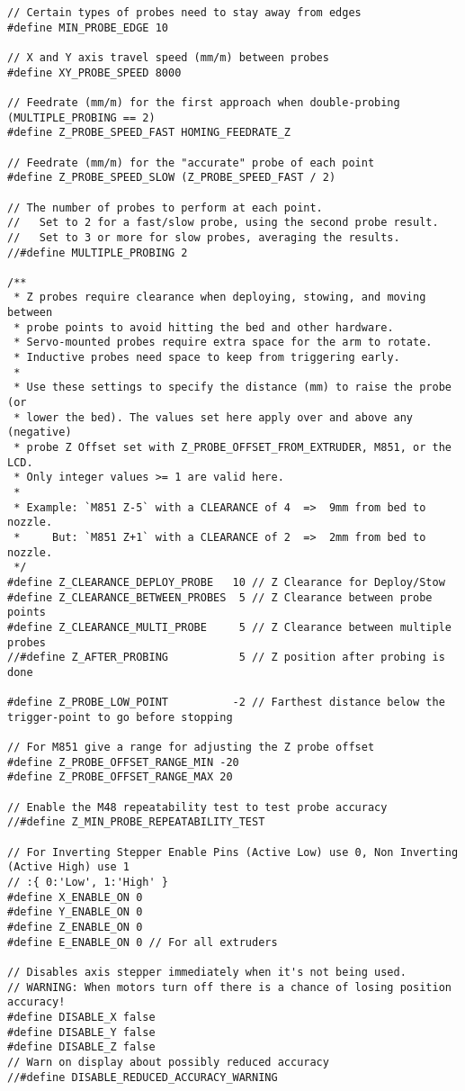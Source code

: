 \begin{lstlisting}[caption = キャプション, label = ラベル]
// Certain types of probes need to stay away from edges
#define MIN_PROBE_EDGE 10

// X and Y axis travel speed (mm/m) between probes
#define XY_PROBE_SPEED 8000

// Feedrate (mm/m) for the first approach when double-probing (MULTIPLE_PROBING == 2)
#define Z_PROBE_SPEED_FAST HOMING_FEEDRATE_Z

// Feedrate (mm/m) for the "accurate" probe of each point
#define Z_PROBE_SPEED_SLOW (Z_PROBE_SPEED_FAST / 2)

// The number of probes to perform at each point.
//   Set to 2 for a fast/slow probe, using the second probe result.
//   Set to 3 or more for slow probes, averaging the results.
//#define MULTIPLE_PROBING 2

/**
 * Z probes require clearance when deploying, stowing, and moving between
 * probe points to avoid hitting the bed and other hardware.
 * Servo-mounted probes require extra space for the arm to rotate.
 * Inductive probes need space to keep from triggering early.
 *
 * Use these settings to specify the distance (mm) to raise the probe (or
 * lower the bed). The values set here apply over and above any (negative)
 * probe Z Offset set with Z_PROBE_OFFSET_FROM_EXTRUDER, M851, or the LCD.
 * Only integer values >= 1 are valid here.
 *
 * Example: `M851 Z-5` with a CLEARANCE of 4  =>  9mm from bed to nozzle.
 *     But: `M851 Z+1` with a CLEARANCE of 2  =>  2mm from bed to nozzle.
 */
#define Z_CLEARANCE_DEPLOY_PROBE   10 // Z Clearance for Deploy/Stow
#define Z_CLEARANCE_BETWEEN_PROBES  5 // Z Clearance between probe points
#define Z_CLEARANCE_MULTI_PROBE     5 // Z Clearance between multiple probes
//#define Z_AFTER_PROBING           5 // Z position after probing is done

#define Z_PROBE_LOW_POINT          -2 // Farthest distance below the trigger-point to go before stopping

// For M851 give a range for adjusting the Z probe offset
#define Z_PROBE_OFFSET_RANGE_MIN -20
#define Z_PROBE_OFFSET_RANGE_MAX 20

// Enable the M48 repeatability test to test probe accuracy
//#define Z_MIN_PROBE_REPEATABILITY_TEST

// For Inverting Stepper Enable Pins (Active Low) use 0, Non Inverting (Active High) use 1
// :{ 0:'Low', 1:'High' }
#define X_ENABLE_ON 0
#define Y_ENABLE_ON 0
#define Z_ENABLE_ON 0
#define E_ENABLE_ON 0 // For all extruders

// Disables axis stepper immediately when it's not being used.
// WARNING: When motors turn off there is a chance of losing position accuracy!
#define DISABLE_X false
#define DISABLE_Y false
#define DISABLE_Z false
// Warn on display about possibly reduced accuracy
//#define DISABLE_REDUCED_ACCURACY_WARNING


\end{lstlisting}
